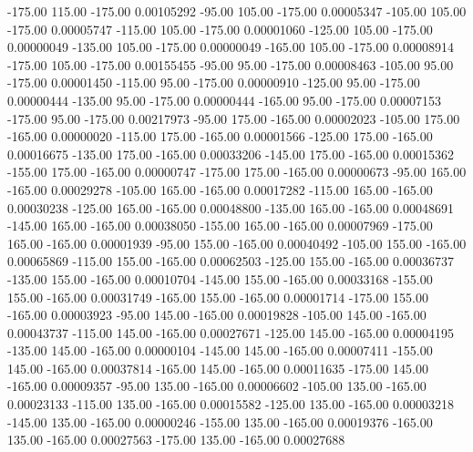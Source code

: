    -175.00    115.00   -175.00     0.00105292
    -95.00    105.00   -175.00     0.00005347
   -105.00    105.00   -175.00     0.00005747
   -115.00    105.00   -175.00     0.00001060
   -125.00    105.00   -175.00     0.00000049
   -135.00    105.00   -175.00     0.00000049
   -165.00    105.00   -175.00     0.00008914
   -175.00    105.00   -175.00     0.00155455
    -95.00     95.00   -175.00     0.00008463
   -105.00     95.00   -175.00     0.00001450
   -115.00     95.00   -175.00     0.00000910
   -125.00     95.00   -175.00     0.00000444
   -135.00     95.00   -175.00     0.00000444
   -165.00     95.00   -175.00     0.00007153
   -175.00     95.00   -175.00     0.00217973
    -95.00    175.00   -165.00     0.00002023
   -105.00    175.00   -165.00     0.00000020
   -115.00    175.00   -165.00     0.00001566
   -125.00    175.00   -165.00     0.00016675
   -135.00    175.00   -165.00     0.00033206
   -145.00    175.00   -165.00     0.00015362
   -155.00    175.00   -165.00     0.00000747
   -175.00    175.00   -165.00     0.00000673
    -95.00    165.00   -165.00     0.00029278
   -105.00    165.00   -165.00     0.00017282
   -115.00    165.00   -165.00     0.00030238
   -125.00    165.00   -165.00     0.00048800
   -135.00    165.00   -165.00     0.00048691
   -145.00    165.00   -165.00     0.00038050
   -155.00    165.00   -165.00     0.00007969
   -175.00    165.00   -165.00     0.00001939
    -95.00    155.00   -165.00     0.00040492
   -105.00    155.00   -165.00     0.00065869
   -115.00    155.00   -165.00     0.00062503
   -125.00    155.00   -165.00     0.00036737
   -135.00    155.00   -165.00     0.00010704
   -145.00    155.00   -165.00     0.00033168
   -155.00    155.00   -165.00     0.00031749
   -165.00    155.00   -165.00     0.00001714
   -175.00    155.00   -165.00     0.00003923
    -95.00    145.00   -165.00     0.00019828
   -105.00    145.00   -165.00     0.00043737
   -115.00    145.00   -165.00     0.00027671
   -125.00    145.00   -165.00     0.00004195
   -135.00    145.00   -165.00     0.00000104
   -145.00    145.00   -165.00     0.00007411
   -155.00    145.00   -165.00     0.00037814
   -165.00    145.00   -165.00     0.00011635
   -175.00    145.00   -165.00     0.00009357
    -95.00    135.00   -165.00     0.00006602
   -105.00    135.00   -165.00     0.00023133
   -115.00    135.00   -165.00     0.00015582
   -125.00    135.00   -165.00     0.00003218
   -145.00    135.00   -165.00     0.00000246
   -155.00    135.00   -165.00     0.00019376
   -165.00    135.00   -165.00     0.00027563
   -175.00    135.00   -165.00     0.00027688
